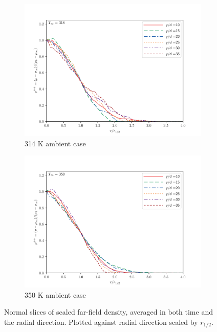 \begin{figure}[H]
\begin{center}
\begin{subfigure}{0.45\textwidth}
	\includegraphics[scale=.45]{figures/Plots/radial/slices_5/314_ambient/r_vs_rho.pdf}
	\caption{314 K ambient case} \label{noniso_r_vs_rho_1}
\end{subfigure}
\begin{subfigure}{0.45\textwidth}
	\includegraphics[scale=.45]{figures/Plots/radial/slices_5/350_ambient/r_vs_rho.pdf}
	\caption{350 K ambient case} \label{noniso_r_vs_rho_2}
\end{subfigure}
\caption{Normal slices of scaled far-field density, averaged in both time and the radial direction. Plotted against radial direction scaled by $r_{1/2}$.}
\label{noniso_far_r_rho_features}
\end{center}
\end{figure}

